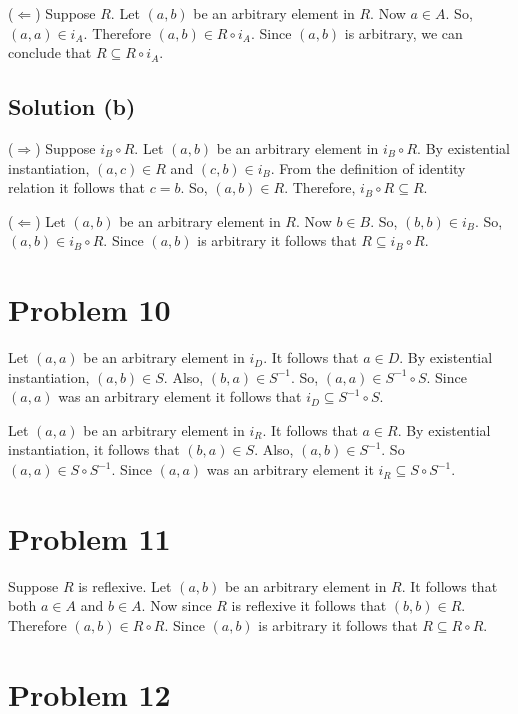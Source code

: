 \documentclass{article}
\begin{document}
($\Leftarrow$) Suppose $R$. Let $(a,b)$ be an arbitrary element in
$R$. Now $a \in A$. So, $(a,a) \in i_A$. Therefore $(a,b) \in R \circ
i_A$. Since $(a,b)$ is arbitrary, we can conclude that $R \subseteq R
\circ i_A$.

\subsection{Solution (b)}

($\Rightarrow$) Suppose $i_B \circ R$. Let $(a,b)$ be an arbitrary element in $i_B
\circ R$. By existential instantiation, $(a,c) \in R$ and $(c,b) \in
i_B$. From the definition of identity relation it follows that $c =
b$. So, $(a,b) \in R$. Therefore, $i_B \circ R \subseteq R$.

($\Leftarrow$) Let $(a,b)$ be an arbitrary element in $R$. Now $b \in
B$. So, $(b,b) \in i_B$. So, $(a,b) \in i_B \circ R$. Since $(a,b)$ is
arbitrary it follows that $R \subseteq i_B \circ R$.

\section{Problem 10}

Let $(a,a)$ be an arbitrary element in $i_D$. It follows that $a \in
D$. By existential instantiation, $(a,b) \in S$. Also, $(b,a) \in
S^{-1}$. So, $(a,a) \in S^{-1} \circ S$. Since $(a,a)$ was an
arbitrary element it follows that $i_D \subseteq S^{-1} \circ S$.

Let $(a,a)$ be an arbitrary element in $i_R$. It follows that $a \in
R$. By existential instantiation, it follows that $(b,a) \in S$. Also,
$(a,b) \in S^{-1}$. So $(a,a) \in S \circ S^{-1}$. Since $(a,a)$  was
an arbitrary element it $i_R \subseteq S \circ S^{-1}$.

\section{Problem 11}

Suppose $R$ is reflexive. Let $(a,b)$ be an arbitrary element in $R$.
It follows that both $a \in A$ and $b \in A$. Now since $R$ is
reflexive it follows that $(b,b) \in R$. Therefore $(a,b) \in R \circ
R$. Since $(a,b)$ is arbitrary it follows that $R \subseteq R \circ R$.

\section{Problem 12}
\end{document}
